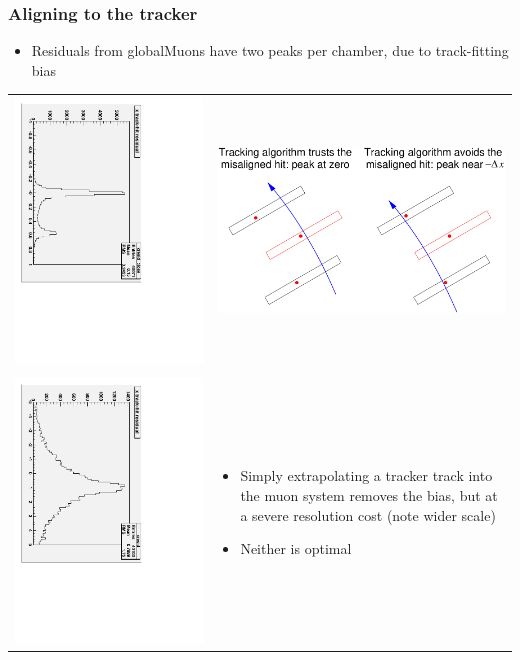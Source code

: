 \documentclass[compress]{beamer}
\begin{document}
\begin{frame}
\frametitle{Aligning to the tracker}
\begin{itemize}
\item Residuals from globalMuons have two peaks per chamber, due to track-fitting bias
\end{itemize}

\begin{tabular}{p{0.4\linewidth} p{0.6\linewidth}}
\begin{minipage}{\linewidth}
\includegraphics[width=3 cm, angle=90]{realplots/bias_residual_globalMuon}
\end{minipage} &
\begin{minipage}{\linewidth}
\begin{center}
\includegraphics[height=3 cm]{realplots/two_cases.pdf}
\end{center}
\end{minipage} \\
 & \\
\begin{minipage}{\linewidth}
\includegraphics[width=3 cm, angle=90]{realplots/bias_residual_tracker-to-muon}
\end{minipage} &
\begin{minipage}{\linewidth}
\begin{itemize}
\item Simply extrapolating a tracker track into the muon system removes the bias, but at a severe resolution cost (note wider scale)
\item Neither is optimal
\end{itemize}
\end{minipage}
\end{tabular}
\end{frame}
\end{document}
